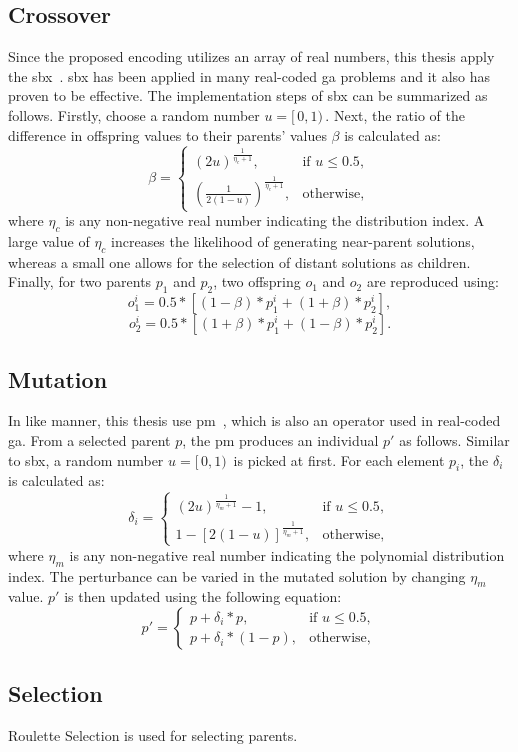 \subsection{Crossover}
Since the proposed encoding utilizes an array of real numbers, this thesis apply the \gls{sbx}~\cite{deb1995simulated}. \gls{sbx} has been applied in many real-coded \gls{ga} problems and it also has proven to be effective. The implementation steps of \gls{sbx} can be summarized as follows. Firstly, choose a random number $u = [ \, 0, 1) \,$. Next, the ratio of the difference in offspring values to their parents' values $\beta$ is calculated as:
\begin{equation}
	\beta = 
	\begin{cases}
		(2u)^{\frac{1}{\eta_c + 1}}, & \text{if $u \leq 0.5$},\\
		(\frac{1}{2(1 - u)})^{\frac{1}{\eta_c + 1}}, & \text{otherwise},
	\end{cases}  
\end{equation}
where $\eta_c$ is any non-negative real number indicating the distribution index. A large value of $\eta_c$ increases the likelihood of generating near-parent solutions, whereas a small one allows for the selection of distant solutions as children. Finally, for two parents $p_1$ and $p_2$, two offspring $o_1$ and $o_2$ are reproduced using:
\begin{equation}
	o^i_1 = 0.5*[(1-\beta)*p^i_1 + (1+\beta)*p^i_2],
\end{equation}
\begin{equation}
	o^i_2 = 0.5*[(1+\beta)*p^i_1 + (1-\beta)*p^i_2].
\end{equation}

\subsection{Mutation}
In like manner, this thesis use \gls{pm}~\cite{deb2014analysing}, which is also an operator used in real-coded \gls{ga}. From a selected parent $p$, the \gls{pm} produces an individual $p'$ as follows. Similar to \gls{sbx}, a random number $u = 	[ \, 0, 1) \,$ is picked at first. For each element $p_i$, the $\delta_i$ is calculated as:
\begin{equation}
	\delta_i = 
	\begin{cases}
		(2u)^{\frac{1}{\eta_m + 1}} - 1, & \text{if $u \leq 0.5$},\\
		1 - [2(1-u)]^{\frac{1}{\eta_m + 1}}, & \text{otherwise},
	\end{cases}
\end{equation}
where $\eta_m$ is any non-negative real number indicating the polynomial distribution index. The perturbance can be varied in the mutated solution by changing $\eta_m$ value. $p'$ is then updated using the following equation:
\begin{equation}
	p' = 
	\begin{cases}
		p + \delta_i * p, & \text{if $u \leq 0.5$},\\
		p + \delta_i * (1-p), & \text{otherwise},
	\end{cases}
\end{equation}

\subsection{Selection}
Roulette Selection is used for selecting parents.